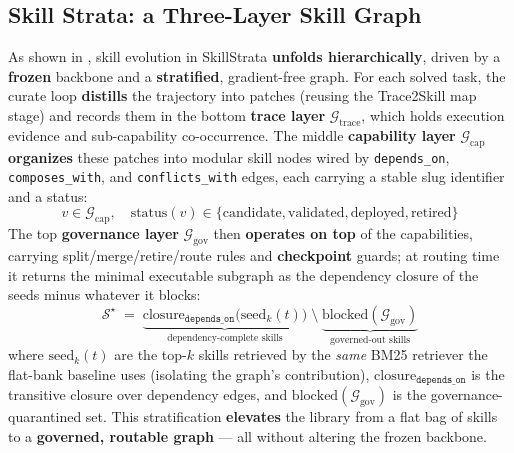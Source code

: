 \subsection{Skill Strata: a Three-Layer Skill Graph}
\label{sec:m1}

As shown in , %
skill evolution in SkillStrata \textbf{unfolds hierarchically}, driven by a \textbf{frozen} backbone and a \textbf{stratified}, gradient-free graph.
For each solved task, the curate loop \textbf{distills} the trajectory into patches (reusing the Trace2Skill map stage) and records them in the bottom \textbf{trace layer} $\mathcal{G}_{\text{trace}}$, which holds execution evidence and sub-capability co-occurrence.
The middle \textbf{capability layer} $\mathcal{G}_{\text{cap}}$ \textbf{organizes} these patches into modular skill nodes wired by \texttt{depends\_on}, \texttt{composes\_with}, and \texttt{conflicts\_with} edges, each carrying a stable slug identifier and a status:
\begin{equation}
v \in \mathcal{G}_{\text{cap}},\quad
\text{status}(v)\in\{\text{candidate},\text{validated},\text{deployed},\text{retired}\}
\label{eq:node}
\end{equation}
The top \textbf{governance layer} $\mathcal{G}_{\text{gov}}$ then \textbf{operates on top} of the capabilities, carrying split/merge/retire/route rules and \textbf{checkpoint} guards; at routing time it returns the minimal executable subgraph as the dependency closure of the seeds minus whatever it blocks:
\begin{equation}
\mathcal{S}^\star \;=\; \underbrace{\text{closure}_{\texttt{depends\_on}}\big(\text{seed}_k(t)\big)}_{\text{dependency-complete skills}} \;\setminus\; \underbrace{\text{blocked}(\mathcal{G}_{\text{gov}})}_{\text{governed-out skills}}
\label{eq:route}
\end{equation}
where $\text{seed}_k(t)$ are the top-$k$ skills retrieved by the \emph{same} BM25 retriever the flat-bank baseline uses (isolating the graph's contribution), $\text{closure}_{\texttt{depends\_on}}$ is the transitive closure over dependency edges, and $\text{blocked}(\mathcal{G}_{\text{gov}})$ is the governance-quarantined set.
This stratification \textbf{elevates} the library from a flat bag of skills to a \textbf{governed, routable graph} --- all without altering the frozen backbone.

